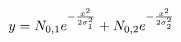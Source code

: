 \documentclass{article}
\begin{document}
\begin{equation}
  y=N_{0,1}e^{-\frac{x^2}{2\sigma_1^2}}+N_{0,2}e^{-\frac{x^2}{2\sigma_2^2}}\notag
\end{equation}
\end{document}

